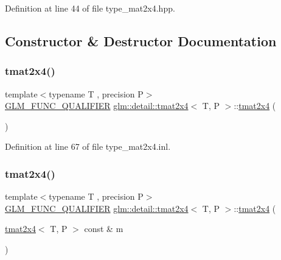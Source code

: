 Definition at line 44 of file type\+\_\+mat2x4.\+hpp.



\subsection{Constructor \& Destructor Documentation}
\mbox{\label{structglm_1_1detail_1_1tmat2x4_aa0dd80e32a774e0f5e07a65c8a4d6c66}} 
\subsubsection{\texorpdfstring{tmat2x4()}{tmat2x4()}\hspace{0.1cm}{\footnotesize\ttfamily [1/22]}}
{\footnotesize\ttfamily template$<$typename T , precision P$>$ \\
\hyperlink{setup_8hpp_a33fdea6f91c5f834105f7415e2a64407}{G\+L\+M\+\_\+\+F\+U\+N\+C\+\_\+\+Q\+U\+A\+L\+I\+F\+I\+ER} \hyperlink{structglm_1_1detail_1_1tmat2x4}{glm\+::detail\+::tmat2x4}$<$ T, P $>$\+::\hyperlink{structglm_1_1detail_1_1tmat2x4}{tmat2x4} (\begin{DoxyParamCaption}{ }\end{DoxyParamCaption})}



Definition at line 67 of file type\+\_\+mat2x4.\+inl.

\mbox{\label{structglm_1_1detail_1_1tmat2x4_a2246d953fc5f0c2024b887d1a4c83a06}} 
\subsubsection{\texorpdfstring{tmat2x4()}{tmat2x4()}\hspace{0.1cm}{\footnotesize\ttfamily [2/22]}}
{\footnotesize\ttfamily template$<$typename T , precision P$>$ \\
\hyperlink{setup_8hpp_a33fdea6f91c5f834105f7415e2a64407}{G\+L\+M\+\_\+\+F\+U\+N\+C\+\_\+\+Q\+U\+A\+L\+I\+F\+I\+ER} \hyperlink{structglm_1_1detail_1_1tmat2x4}{glm\+::detail\+::tmat2x4}$<$ T, P $>$\+::\hyperlink{structglm_1_1detail_1_1tmat2x4}{tmat2x4} (\begin{DoxyParamCaption}\item[{\hyperlink{structglm_1_1detail_1_1tmat2x4}{tmat2x4}$<$ T, P $>$ const \&}]{m }\end{DoxyParamCaption})}




